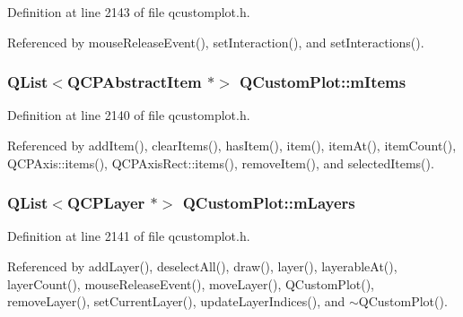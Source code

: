 Definition at line 2143 of file qcustomplot.\+h.



Referenced by mouse\+Release\+Event(), set\+Interaction(), and set\+Interactions().

\hypertarget{class_q_custom_plot_afa5fd6957169dfef2e4e7815a04c36e0}{}
\subsubsection[{m\+Items}]{\setlength{\rightskip}{0pt plus 5cm}Q\+List$<${\bf Q\+C\+P\+Abstract\+Item} $\ast$$>$ Q\+Custom\+Plot\+::m\+Items\hspace{0.3cm}{\ttfamily [protected]}}\label{class_q_custom_plot_afa5fd6957169dfef2e4e7815a04c36e0}


Definition at line 2140 of file qcustomplot.\+h.



Referenced by add\+Item(), clear\+Items(), has\+Item(), item(), item\+At(), item\+Count(), Q\+C\+P\+Axis\+::items(), Q\+C\+P\+Axis\+Rect\+::items(), remove\+Item(), and selected\+Items().

\hypertarget{class_q_custom_plot_a9685e7ec1ef5e6066dd7d91bb3a698b3}{}
\subsubsection[{m\+Layers}]{\setlength{\rightskip}{0pt plus 5cm}Q\+List$<${\bf Q\+C\+P\+Layer} $\ast$$>$ Q\+Custom\+Plot\+::m\+Layers\hspace{0.3cm}{\ttfamily [protected]}}\label{class_q_custom_plot_a9685e7ec1ef5e6066dd7d91bb3a698b3}


Definition at line 2141 of file qcustomplot.\+h.



Referenced by add\+Layer(), deselect\+All(), draw(), layer(), layerable\+At(), layer\+Count(), mouse\+Release\+Event(), move\+Layer(), Q\+Custom\+Plot(), remove\+Layer(), set\+Current\+Layer(), update\+Layer\+Indices(), and $\sim$\+Q\+Custom\+Plot().

\hypertarget{class_q_custom_plot_a2f2e8b25e59cf3cf7b15e4767c02e747}{}

